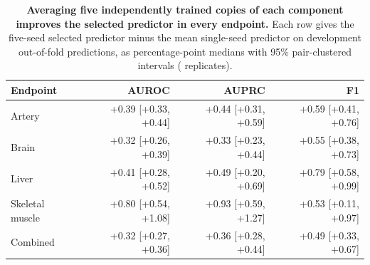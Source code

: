 \begin{table}[H]
\centering
\footnotesize
\caption{\textbf{Averaging five independently trained copies of each component improves the selected predictor in every endpoint.} Each row gives the five-seed selected predictor minus the mean single-seed predictor on development out-of-fold predictions, as percentage-point medians with 95\% pair-clustered intervals (\SeedAvgBootstrapReplicates{} replicates).}\label{tab:seedavg}
\begin{tabular}{lrrr}
\toprule
Endpoint & AUROC & AUPRC & F1 \\
\midrule
Artery & +0.39 [+0.33, +0.44] & +0.44 [+0.31, +0.59] & +0.59 [+0.41, +0.76] \\
Brain & +0.32 [+0.26, +0.39] & +0.33 [+0.23, +0.44] & +0.55 [+0.38, +0.73] \\
Liver & +0.41 [+0.28, +0.52] & +0.49 [+0.20, +0.69] & +0.79 [+0.58, +0.99] \\
Skeletal muscle & +0.80 [+0.54, +1.08] & +0.93 [+0.59, +1.27] & +0.53 [+0.11, +0.97] \\
Combined & +0.32 [+0.27, +0.36] & +0.36 [+0.28, +0.44] & +0.49 [+0.33, +0.67] \\
\bottomrule
\end{tabular}
\end{table}
